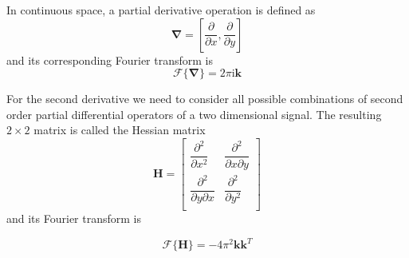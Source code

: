 		In continuous space, a partial derivative operation is defined as
		\begin{equation}
		 	\mathbf{\nabla} = \left[ \dfrac{\partial}{\partial x}, \dfrac{\partial}{\partial y} \right]
		\end{equation}
		and its corresponding Fourier transform is
		\begin{equation}
			\mathscr{F}\{\mathbf{\nabla}\} = 2 \pi \text{i} \mathbf{k}
		\end{equation}
		
		For the second derivative we need to consider all possible combinations of second order partial differential operators of a two dimensional signal. The resulting $2 \times 2$ matrix is called the Hessian matrix
		\begin{equation}
			\mathbf{H} = 
				\begin{bmatrix}
   \dfrac{\partial^2}{\partial x^2}       & \dfrac{\partial^2}{\partial x \partial y}\\
   \dfrac{\partial^2}{\partial y \partial x}       & \dfrac{\partial^2}{\partial y^2}\\
				\end{bmatrix}
				\label{eq:hessian_def}
		\end{equation}
		and its Fourier transform is
		
		\begin{equation}
			\mathscr{F}\{\mathbf{H}\} = -4 \pi^2 \mathbf{k}\mathbf{k}^T
		\end{equation}
		
